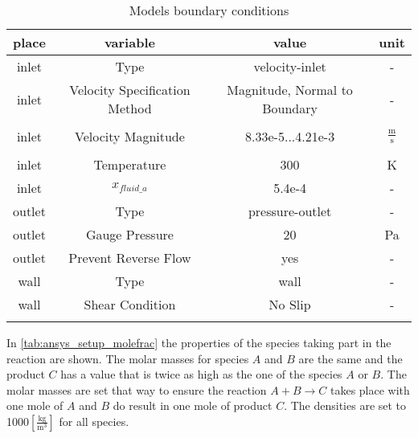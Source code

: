 \documentclass[../thesis.tex]{subfiles}
\begin{document}
\begin{table} [htb]
	\centering
	\caption{Models boundary conditions}
	\begin{tabular}{ cccc }
		\hline
		place & variable & value & unit \\
		\hline
		inlet & Type & velocity-inlet & - \\
		inlet & Velocity Specification Method & Magnitude, Normal to Boundary & - \\
		\\[-1em]
		inlet & Velocity Magnitude & 8.33e-5...4.21e-3 & $\frac{\text{m}}{\text{s}}$ \\
		\\[-1em]
		inlet & Temperature & 300 & K \\
		inlet & $x_{fluid\_a}$ & 5.4e-4 & - \\
		outlet & Type & pressure-outlet & - \\
		outlet & Gauge Pressure & 20 & Pa \\
		outlet & Prevent Reverse Flow & yes & - \\
		wall & Type & wall & - \\
		wall & Shear Condition & No Slip & - \\
		\hline
		\label{tab:ansys_setup_boundary}
	\end{tabular}
\end{table}
In \autoref{tab:ansys_setup_molefrac} the properties of the species taking part in the reaction are shown. The molar masses for species $A$ and $B$ are the same and the product $C$ has a value that is twice as high as the one of the species $A$ or $B$. The molar masses are set that way to ensure the reaction $A+B \rightarrow C$ takes place with one mole of $A$ and $B$ do result in one mole of product $C$. The densities are set to 1000$ \left[\frac{\mathrm{kg}}{\mathrm{m}^3}\right] $ for all species.
\end{document}
